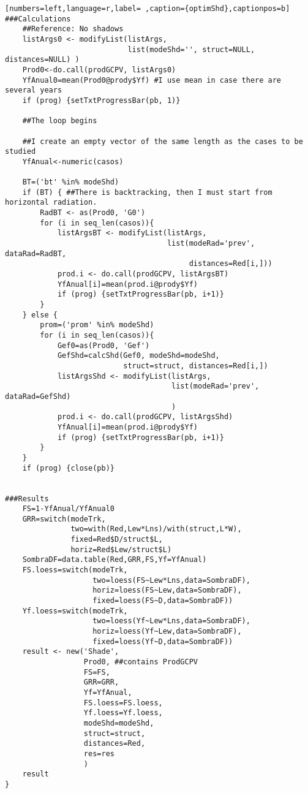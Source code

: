 \begin{lstlisting}[numbers=left,language=r,label= ,caption={optimShd},captionpos=b]
###Calculations	
    ##Reference: No shadows	
    listArgs0 <- modifyList(listArgs,
                            list(modeShd='', struct=NULL, distances=NULL) )
    Prod0<-do.call(prodGCPV, listArgs0)
    YfAnual0=mean(Prod0@prody$Yf) #I use mean in case there are several years
    if (prog) {setTxtProgressBar(pb, 1)}

    ##The loop begins

    ##I create an empty vector of the same length as the cases to be studied
    YfAnual<-numeric(casos) 

    BT=('bt' %in% modeShd)
    if (BT) { ##There is backtracking, then I must start from horizontal radiation.
        RadBT <- as(Prod0, 'G0')
        for (i in seq_len(casos)){
            listArgsBT <- modifyList(listArgs,
                                     list(modeRad='prev', dataRad=RadBT,
                                          distances=Red[i,]))
            prod.i <- do.call(prodGCPV, listArgsBT)
            YfAnual[i]=mean(prod.i@prody$Yf)
            if (prog) {setTxtProgressBar(pb, i+1)}
        }
    } else {
        prom=('prom' %in% modeShd)
        for (i in seq_len(casos)){
            Gef0=as(Prod0, 'Gef')
            GefShd=calcShd(Gef0, modeShd=modeShd,
                           struct=struct, distances=Red[i,])
            listArgsShd <- modifyList(listArgs,
                                      list(modeRad='prev', dataRad=GefShd)
                                      )
            prod.i <- do.call(prodGCPV, listArgsShd)
            YfAnual[i]=mean(prod.i@prody$Yf)
            if (prog) {setTxtProgressBar(pb, i+1)}
        }
    }
    if (prog) {close(pb)}


###Results
    FS=1-YfAnual/YfAnual0
    GRR=switch(modeTrk,
               two=with(Red,Lew*Lns)/with(struct,L*W),
               fixed=Red$D/struct$L,
               horiz=Red$Lew/struct$L)
    SombraDF=data.table(Red,GRR,FS,Yf=YfAnual)
    FS.loess=switch(modeTrk,
                    two=loess(FS~Lew*Lns,data=SombraDF),
                    horiz=loess(FS~Lew,data=SombraDF),
                    fixed=loess(FS~D,data=SombraDF))
    Yf.loess=switch(modeTrk,
                    two=loess(Yf~Lew*Lns,data=SombraDF),
                    horiz=loess(Yf~Lew,data=SombraDF),
                    fixed=loess(Yf~D,data=SombraDF))
    result <- new('Shade',
                  Prod0, ##contains ProdGCPV
                  FS=FS,
                  GRR=GRR,
                  Yf=YfAnual,
                  FS.loess=FS.loess,
                  Yf.loess=Yf.loess,
                  modeShd=modeShd,
                  struct=struct,
                  distances=Red,
                  res=res
                  )
    result
}
\end{lstlisting}
